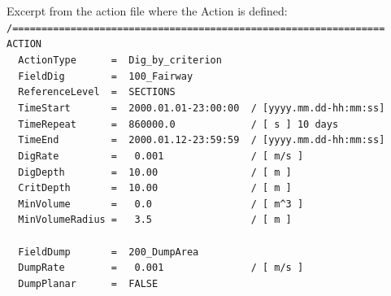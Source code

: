 Excerpt from the action file where the Action is defined:
\\ \hspace*{3mm} \texttt{\small{/================================================================}}
\\ \hspace*{3mm} \texttt{\small{ACTION}}
\\ \hspace*{3mm} \texttt{\small{~~ActionType~~~~~~=~~Dig\_by\_criterion}}
\\ \hspace*{3mm} \texttt{\small{~~FieldDig~~~~~~~~=~~100\_Fairway}}
\\ \hspace*{3mm} \texttt{\small{~~ReferenceLevel~~=~~SECTIONS}}
\\ \hspace*{3mm} \texttt{\small{~~TimeStart~~~~~~~=~~2000.01.01-23:00:00~~/~[yyyy.mm.dd-hh:mm:ss]}}
\\ \hspace*{3mm} \texttt{\small{~~TimeRepeat~~~~~~=~~860000.0~~~~~~~~~~~~~/~[~s~] 10 days}}
\\ \hspace*{3mm} \texttt{\small{~~TimeEnd~~~~~~~~~=~~2000.01.12-23:59:59~~/~[yyyy.mm.dd-hh:mm:ss]}}
\\ \hspace*{3mm} \texttt{\small{~~DigRate~~~~~~~~~=~~~0.001~~~~~~~~~~~~~~~/~[~m/s~]}}
\\ \hspace*{3mm} \texttt{\small{~~DigDepth~~~~~~~~=~~10.00~~~~~~~~~~~~~~~~/~[~m~]}}
\\ \hspace*{3mm} \texttt{\small{~~CritDepth~~~~~~~=~~10.00~~~~~~~~~~~~~~~~/~[~m~]}}
\\ \hspace*{3mm} \texttt{\small{~~MinVolume~~~~~~~=~~~0.0~~~~~~~~~~~~~~~~~/~[~m\textasciicircum3~]}}
\\ \hspace*{3mm} \texttt{\small{~~MinVolumeRadius~=~~~3.5~~~~~~~~~~~~~~~~~/~[~m~]}}
\\ \hspace*{3mm}
\\ \hspace*{3mm} \texttt{\small{~~FieldDump~~~~~~~=~~200\_DumpArea}}
\\ \hspace*{3mm} \texttt{\small{~~DumpRate~~~~~~~~=~~~0.001~~~~~~~~~~~~~~~/~[~m/s~]}}
\\ \hspace*{3mm} \texttt{\small{~~DumpPlanar~~~~~~=~~FALSE}}
